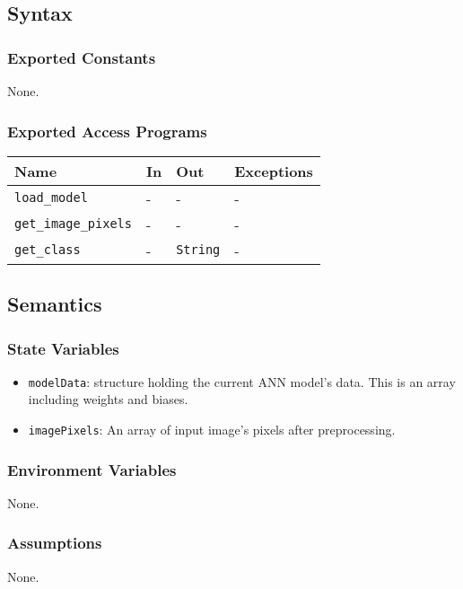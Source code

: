 \documentclass[12pt, titlepage]{article}
\def\code#1{\texttt{#1}}
\begin{document}
\subsection{Syntax}

\subsubsection{Exported Constants}
None.

\subsubsection{Exported Access Programs}

\begin{center}
\begin{tabular}{p{3cm} p{4cm} p{4cm} p{2cm}}
\hline
\textbf{Name} & \textbf{In} & \textbf{Out} & \textbf{Exceptions} \\
\hline
\code{load\_model} & - & - & - \\
\code{get\_image\_pixels} & - & - & - \\
\code{get\_class} & - & \code{String} &  -\\
\hline
\end{tabular}
\end{center}

\subsection{Semantics}

\subsubsection{State Variables}
\begin{itemize}
  \item \code{modelData}: structure holding the current ANN model's data. 
  This is an array including weights and biases.
  \item \code{imagePixels}: An array of input image's pixels after preprocessing.
\end{itemize}

\subsubsection{Environment Variables}
None.

\subsubsection{Assumptions}
None.
\end{document}
